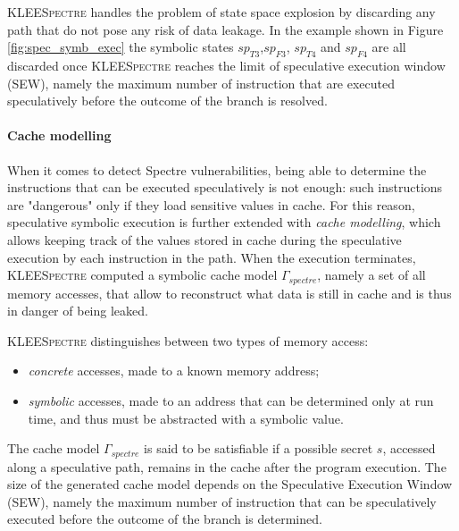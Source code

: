 \documentclass[target=mst,aauheader=aics]{thud}
\theoremstyle{definition}
\begin{document}
	\textsc{KLEESpectre} handles the problem of state space explosion by discarding any path that do not pose any risk of data leakage. In the example shown in Figure \ref{fig:spec_symb_exec} the symbolic states $sp_{T3}$,$sp_{F3}$, $sp_{T4}$ and $sp_{F4}$ are all discarded once \textsc{KLEESpectre} reaches the limit of speculative execution window (SEW), namely the maximum number of instruction that are executed speculatively before the outcome of the branch is resolved. 
	\paragraph{Cache modelling} 
	When it comes to detect Spectre vulnerabilities, being able to determine the instructions that can be executed speculatively is not enough: such instructions are "dangerous" only if they load sensitive values in cache. For this reason, speculative symbolic execution is further extended with \textit{cache modelling}, which allows keeping track of the values stored in cache during the speculative execution by each instruction in the path. When the execution terminates, \textsc{KLEESpectre} computed a symbolic cache model $\Gamma_{spectre}$, namely a set of all memory accesses, that allow to reconstruct what data is still in cache and is thus in danger of being leaked.
	
	\textsc{KLEESpectre} distinguishes between two types of memory access:
	\begin{itemize}
		\item \textit{concrete} accesses, made to a known memory address;
		\item \textit{symbolic} accesses, made to an address that can be determined only at run time, and thus must be abstracted with a symbolic value. 
	\end{itemize}
	The cache model $\Gamma_{spectre}$ is said to be satisfiable if a possible secret $s$, accessed along a speculative path, remains in the cache after the program execution. The size of the generated cache model depends on the Speculative Execution Window (SEW), namely the maximum number of instruction that can be speculatively executed before the outcome of the branch is determined.
	
\end{document}
